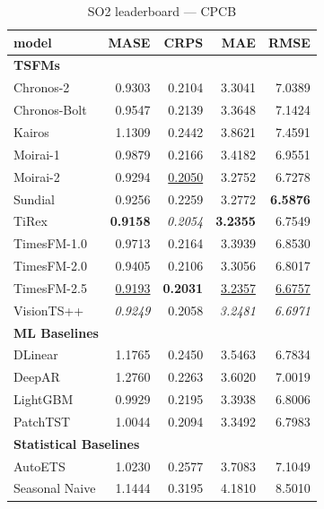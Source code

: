 \begin{table}[H]
\caption{SO2 leaderboard --- CPCB}
\centering
\begin{small}
\begin{tabular}{lrrrr}
\toprule
model & MASE & CRPS & MAE & RMSE \\
\midrule
\multicolumn{5}{l}{\textbf{TSFMs}} \\
Chronos-2 & 0.9303 & 0.2104 & 3.3041 & 7.0389 \\
Chronos-Bolt & 0.9547 & 0.2139 & 3.3648 & 7.1424 \\
Kairos & 1.1309 & 0.2442 & 3.8621 & 7.4591 \\
Moirai-1 & 0.9879 & 0.2166 & 3.4182 & 6.9551 \\
Moirai-2 & 0.9294 & \underline{0.2050} & 3.2752 & 6.7278 \\
Sundial & 0.9256 & 0.2259 & 3.2772 & \textbf{6.5876} \\
TiRex & \textbf{0.9158} & \textit{0.2054} & \textbf{3.2355} & 6.7549 \\
TimesFM-1.0 & 0.9713 & 0.2164 & 3.3939 & 6.8530 \\
TimesFM-2.0 & 0.9405 & 0.2106 & 3.3056 & 6.8017 \\
TimesFM-2.5 & \underline{0.9193} & \textbf{0.2031} & \underline{3.2357} & \underline{6.6757} \\
VisionTS++ & \textit{0.9249} & 0.2058 & \textit{3.2481} & \textit{6.6971} \\
\midrule
\multicolumn{5}{l}{\textbf{ML Baselines}} \\
DLinear & 1.1765 & 0.2450 & 3.5463 & 6.7834 \\
DeepAR & 1.2760 & 0.2263 & 3.6020 & 7.0019 \\
LightGBM & 0.9929 & 0.2195 & 3.3938 & 6.8006 \\
PatchTST & 1.0044 & 0.2094 & 3.3492 & 6.7983 \\
\midrule
\multicolumn{5}{l}{\textbf{Statistical Baselines}} \\
AutoETS & 1.0230 & 0.2577 & 3.7083 & 7.1049 \\
Seasonal Naive & 1.1444 & 0.3195 & 4.1810 & 8.5010 \\
\bottomrule
\end{tabular}
\end{small}
\end{table}